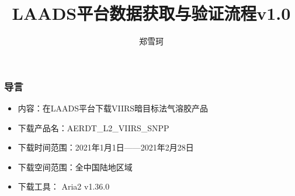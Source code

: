 \documentclass{ctexbeamer}
\title{LAADS平台数据获取与验证流程v1.0}
\author{郑雪珂}
\institute{lengfeng1453@hotmail.com}
\begin{document}
\frame{\titlepage}
\begin{frame}
  \frametitle{导言}
  \begin{itemize}
    \item 内容：在LAADS平台下载VIIRS暗目标法气溶胶产品
    \item 下载产品名：AERDT\_L2\_VIIRS\_SNPP
    \item 下载时间范围：2021年1月1日——2021年2月28日
    \item 下载空间范围：全中国陆地区域
    \item 下载工具： Aria2 v1.36.0
  \end{itemize}
\end{frame}




\end{document}
